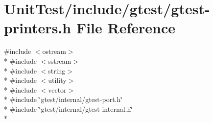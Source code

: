 \hypertarget{gtest-printers_8h}{\section{Unit\+Test/include/gtest/gtest-\/printers.h File Reference}
\label{gtest-printers_8h}
}
{\ttfamily \#include $<$ostream$>$}\\*
{\ttfamily \#include $<$sstream$>$}\\*
{\ttfamily \#include $<$string$>$}\\*
{\ttfamily \#include $<$utility$>$}\\*
{\ttfamily \#include $<$vector$>$}\\*
{\ttfamily \#include \char`\"{}gtest/internal/gtest-\/port.\+h\char`\"{}}\\*
{\ttfamily \#include \char`\"{}gtest/internal/gtest-\/internal.\+h\char`\"{}}\\*
